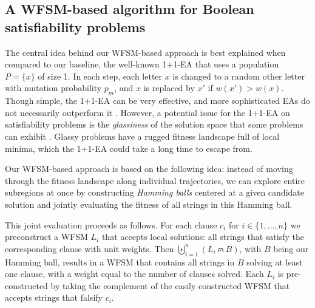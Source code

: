 \documentclass{llncs}
\begin{document}
\subsection{A WFSM-based algorithm for Boolean satisfiability problems}

The central idea behind our WFSM-based approach is best explained when
compared to our baseline, the well-known 1+1-EA that uses a population $P=\{x\}$ of size 1. 
In each step, each letter $x$ is changed to a random other letter with
mutation probability $p_m$, and $x$ is replaced by $x'$ if $w(x') > w(x)$. Though simple, the 1+1-EA
can be very effective, and more sophisticated EAs do not necessarily outperform it 
\cite{Borisovsky_2008}. 
However, a potential issue for the 1+1-EA on satisfiability problems is 
the \emph{glassiness} of the solution space that some problems can exhibit \cite{Martin_2001}.
Glassy problems have a rugged fitness landscape full of local minima, which the 
1+1-EA could take a long time to escape from.

Our WFSM-based approach is based on the following idea: instead of moving through 
the fitness landscape along individual trajectories, we can explore entire subregions at once
by constructing \emph{Hamming balls} centered at a given candidate solution 
and jointly evaluating the fitness of all strings in this Hamming ball.

This joint evaluation proceeds as follows.
For each clause $c_i$ for $i \in \{1, \ldots, n\}$ we preconstruct
a WFSM $L_i$ that accepts local solutions:
all strings that satisfy the corresponding clause with unit weights.
Then \mbox{$\biguplus_{i=1}^n (L_i \capdot B)$}, with $B$ being our Hamming ball,
results in a WFSM that contains all strings in $B$ solving at
least one clause,
with a weight equal to the number of clauses solved.
Each $L_i$ is pre-constructed by taking the complement of the easily
constructed WFSM that accepts strings that falsify $c_i$.
\end{document}
